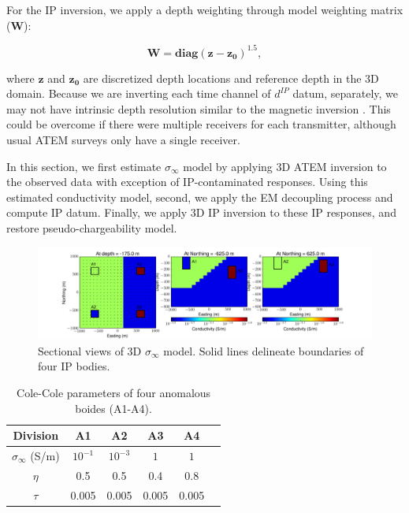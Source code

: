\documentclass[letterpaper,11pt]{article}
\newcommand{\siginf}{\sigma_\infty}
\newcommand{\dip}{d^{IP}}
\begin{document}
For the IP inversion, we apply a depth weighting through model weighting matrix ($\mathbf{W}$):
\begin{linenomath*}
\begin{equation}
    \mathbf{W} = \mathbf{diag}(\mathbf{z-z_0})^{1.5},
    \label{eq: weight_mat}
\end{equation}
\end{linenomath*}
where $\mathbf{z}$ and $\mathbf{z_0}$ are discretized depth locations and reference depth in the 3D domain. Because we are inverting each time channel of $\dip$ datum, separately, we may not have intrinsic depth resolution similar to the magnetic inversion \cite[]{LiMag3D}. This could be overcome if there were multiple receivers for each transmitter, although usual ATEM surveys only have a single receiver.

In this section, we first estimate $\siginf$ model by applying 3D ATEM inversion to the observed data with exception of IP-contaminated responses. Using this estimated conductivity model, second, we apply the EM decoupling process and compute IP datum. Finally, we apply 3D IP inversion to these IP responses, and restore pseudo-chargeability model. 

\begin{figure}[htb]
  \centering
  \includegraphics[width=1.0\textwidth]{figures/sigma_Inf.png}
  \caption{Sectional views of 3D $\siginf$ model. Solid lines delineate boundaries of four IP bodies.}
  \label{Fig:condandetamodel}
\end{figure}

\begin{table}[ht]
\caption{Cole-Cole parameters of four anomalous boides (A1-A4). } %
\begin{center}
  \begin{tabular}{ |c|c|c|c|c|c| } 
  \hline
  Division & A1 & A2 & A3 & A4 \\
  \hline
  $\siginf$ (S/m) & $10^{-1}$ & $10^{-3}$ & $1$   & $1$  \\ 
  $\eta $         & 0.5       & 0.5       & 0.4   & 0.8  \\ 
  $\tau$          & 0.005     & 0.005     & 0.005 & 0.005\\ 
  \hline
  \end{tabular}

\end{center}
\label{Table: properties}  
\end{table}
\end{document}
